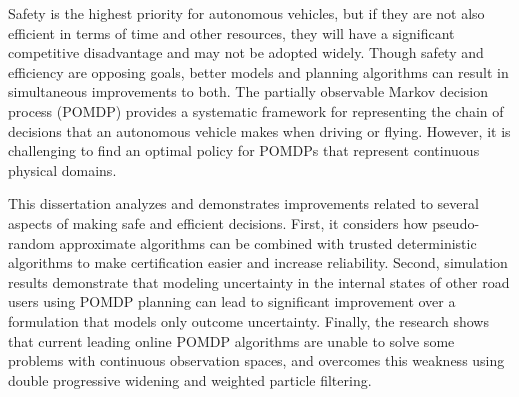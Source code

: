 \documentclass[11pt, letterpaper, oneside, extrafontsizes]{memoir}
\begin{document}
Safety is the highest priority for autonomous vehicles, but if they are not also efficient in terms of time and other resources, they will have a significant competitive disadvantage and may not be adopted widely.
Though safety and efficiency are opposing goals, better models and planning algorithms can result in simultaneous improvements to both.
The partially observable Markov decision process (POMDP) provides a systematic framework for representing the chain of decisions that an autonomous vehicle makes when driving or flying.
However, it is challenging to find an optimal policy for POMDPs that represent continuous physical domains.

This dissertation analyzes and demonstrates improvements related to several aspects of making safe and efficient decisions.
First, it considers how pseudo-random approximate algorithms can be combined with trusted deterministic algorithms to make certification easier and increase reliability.
Second, simulation results demonstrate that modeling uncertainty in the internal states of other road users using POMDP planning can lead to significant improvement over a formulation that models only outcome uncertainty.
Finally, the research shows that current leading online POMDP algorithms are unable to solve some problems with continuous observation spaces, and overcomes this weakness using double progressive widening and weighted particle filtering.

\end{document}
